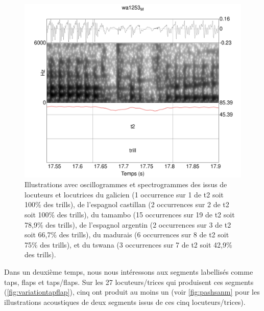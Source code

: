 \begin{figure}
	\includegraphics[width=0.45\linewidth]{substance/spectro_images/tswa1253_1703_6}
	\caption[Illustrations des  issus de 6 locuteurs et locutrices]{Illustrations avec oscillogrammes et spectrogrammes des  issus de locuteurs et locutrices
			du galicien  (1 occurrence sur 1 de t2 soit 100\% des trills),
		    de l'espagnol castillan  (2 occurrences sur 2 de t2 soit 100\% des trills),
		     du tamambo  (15 occurrences sur 19 de t2 soit 78,9\% des trills),
		     de l'espagnol argentin  (2 occurrences sur 3 de t2 soit 66,7\% des trills),
		     du madurais  (6 occurrences sur 8 de t2 soit 75\% des trills),
		     et du tswana  (3 occurrences sur 7 de t2 soit 42,9\% des trills).}
	\label{fig:galicastmalotswa}
\end{figure}

Dans un deuxième temps, nous nous intéressons aux segments labellisés comme taps, flaps et taps/flaps.
Sur les 27 locuteurs/trices qui produisent ces segments (\autoref{fig:variationtapflap}), cinq ont produit au moins un  (voir \autoref{fig:pashsanm} pour les illustrations acoustiques de deux segments issus de ces cinq locuteurs/trices).


